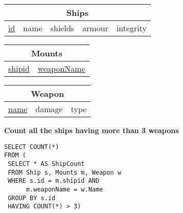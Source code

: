 \documentclass{beamer}
\begin{document}
\begin{frame}[fragile]

\begin{tabular}{|c|c|c|c|c|}
\hline
\multicolumn{5}{|c|}{\textbf{Ships}} \\
\hline
\underline{id} & name & shields & armour & integrity \\
\hline
\end{tabular}

\begin{tabular}{|c|c|}
\hline
\multicolumn{2}{|c|}{\textbf{Mounts}} \\
\hline
\underline{shipid} & \underline{weaponName} \\
\hline
\end{tabular}

\begin{tabular}{|c|c|c|}
\hline
\multicolumn{3}{|c|}{\textbf{Weapon}} \\
\hline
\underline{name} & damage & type \\
\hline
\end{tabular}

\vspace{0.25cm}
\textbf{Count all the ships having more than 3 weapons}

\pause
\begin{lstlisting}[showstringspaces=false]
SELECT COUNT(*)
FROM (
 SELECT * AS ShipCount
 FROM Ship s, Mounts m, Weapon w
 WHERE s.id = m.shipid AND 
      m.weaponName = w.Name
 GROUP BY s.id
 HAVING COUNT(*) > 3)
                   
\end{lstlisting}

\end{frame}
\end{document}
